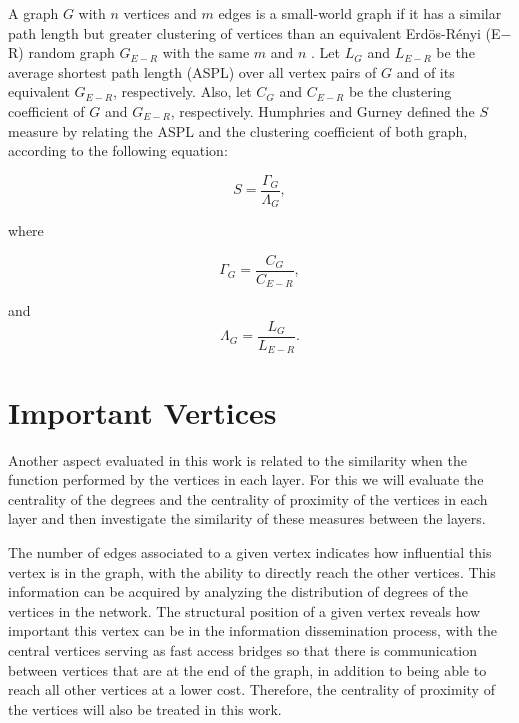 A graph $G $ with $n$ vertices and $m$ edges is a small-world graph  if it has a similar path length but greater clustering of vertices than an equivalent Erd\"{o}s-R\'{e}nyi (E$-$R) random graph $G_{E-R}$  with the same $m$ and $n$ \cite{bollobas01}. Let $L_G$ and $L_{E-R}$ be the average shortest path length (ASPL) over all vertex pairs of $G$ and of its equivalent $G_{E-R}$, respectively. Also, let $C_G$ and $C_{E-R}$ be the clustering coefficient of $G$ and $G_{E-R}$, respectively. Humphries and Gurney defined the $S$ measure by relating the ASPL and the clustering coefficient of both graph, according to the following equation:

\begin{equation}\label{eq:S}
    S=\frac{\Gamma_G}{\Lambda_G},
\end{equation}

where

\begin{equation}\label{eq:3}
    \Gamma_G= \frac{C_G}{C_{E-R}},
\end{equation} 

and 
\begin{equation} \label{eq:4}
    \Lambda_G= \frac{L_G}{L_{E-R}}.
\end{equation}


\section{Important Vertices}
\label{sec:important_vertices}
Another aspect evaluated in this work is related to the similarity when the function performed by the vertices in each layer. For this we will evaluate the centrality of the degrees and the centrality of proximity of the vertices in each layer and then investigate the similarity of these measures between the layers.

The number of edges associated to a given vertex indicates how influential this vertex is in the graph, with the ability to directly reach the other vertices. This information can be acquired by analyzing the distribution of degrees of the vertices in the network. The structural position of a given vertex reveals how important this vertex can be in the information dissemination process, with the central vertices serving as fast access bridges so that there is communication between vertices that are at the end of the graph, in addition to being able to reach all other vertices at a lower cost. Therefore, the centrality of proximity of the vertices will also be treated in this work.

